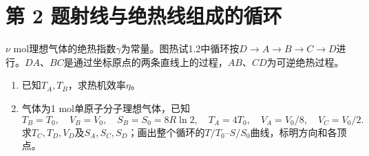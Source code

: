 \documentclass[UTF8,fontset=fandol,a4paper,11pt]{ctexart}
\begin{document}

\section*{第 2 题\quad 射线与绝热线组成的循环}\label{q:2}


$\nu$ mol理想气体的绝热指数$\gamma$为常量。图热试1.2中循环按$D\to A\to B\to C\to D$进行。$DA$、$BC$是通过坐标原点的两条直线上的过程，$AB$、$CD$为可逆绝热过程。
\begin{enumerate}
\item 已知$T_A,T_B$，求热机效率$\eta$。
\item 气体为1 mol单原子分子理想气体，已知
\[
T_B=T_0,\quad V_B=V_0,\quad S_B=S_0=8R\ln2,\quad
T_A=4T_0,\quad V_A=V_0/8,\quad V_C=V_0/2.
\]
求$T_C,T_D,V_D$及$S_A,S_C,S_D$；画出整个循环的$T/T_0$--$S/S_0$曲线，标明方向和各顶点。
\end{enumerate}
\end{document}
